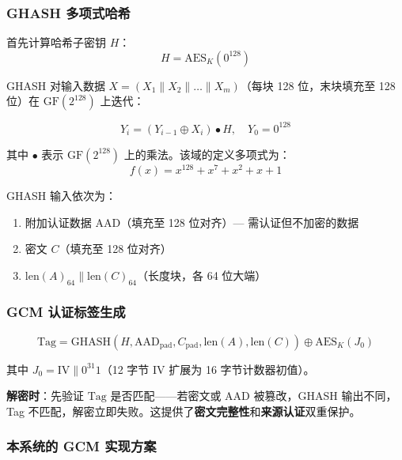 \documentclass[12pt]{article}
\begin{document}
\subsubsection{GHASH 多项式哈希}

首先计算哈希子密钥 $H$：
\begin{equation}
H = \text{AES}_K(0^{128})
\end{equation}

GHASH 对输入数据 $X = (X_1 \parallel X_2 \parallel \dots \parallel X_m)$（每块 128 位，末块填充至 128 位）在 $\text{GF}(2^{128})$ 上迭代：

\begin{equation}
Y_i = (Y_{i-1} \oplus X_i) \bullet H, \quad Y_0 = 0^{128}
\end{equation}

其中 $\bullet$ 表示 $\text{GF}(2^{128})$ 上的乘法。该域的定义多项式为：
\begin{equation}
f(x) = x^{128} + x^7 + x^2 + x + 1
\end{equation}

GHASH 输入依次为：
\begin{enumerate}
    \item 附加认证数据 AAD（填充至 128 位对齐）— 需认证但不加密的数据
    \item 密文 $C$（填充至 128 位对齐）
    \item $\text{len}(A)_{64} \parallel \text{len}(C)_{64}$（长度块，各 64 位大端）
\end{enumerate}

\subsubsection{GCM 认证标签生成}

\begin{equation}
\text{Tag} = \text{GHASH}(H, \text{AAD}_{\text{pad}}, C_{\text{pad}}, \text{len}(A), \text{len}(C)) \oplus \text{AES}_K(J_0)
\end{equation}

其中 $J_0 = \text{IV} \parallel 0^{31}1$（12 字节 IV 扩展为 16 字节计数器初值）。

\textbf{解密时}：先验证 $\text{Tag}$ 是否匹配——若密文或 AAD 被篡改，GHASH 输出不同，Tag 不匹配，解密立即失败。这提供了\textbf{密文完整性}和\textbf{来源认证}双重保护。

\subsubsection{本系统的 GCM 实现方案}
\end{document}
